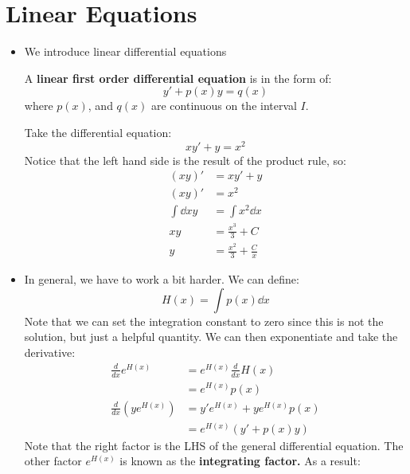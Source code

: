 \section{Linear Equations}
\begin{itemize}
    \item We introduce linear differential equations
    \begin{definition}
        A \textbf{linear first order differential equation} is in the form of:
        \begin{equation}
            y' + p(x)y = q(x)
            \label{eq:}
        \end{equation}
        where $p(x)$, and $q(x)$ are continuous on the interval $I$.
    \end{definition}
    \begin{example}
        Take the differential equation:
        \begin{equation}
            xy' + y= x^2
            \label{eq:}
        \end{equation}
        Notice that the left hand side is the result of the product rule, so:
        \begin{align}
            (xy)' &= xy' + y \\
            (xy)' &= x^2 \\ 
            \int \dd{xy} &= \int x^2 \dd{x} \\ 
            xy &= \frac{x^3}{3} + C \\ 
            y &= \frac{x^2}{3} + \frac{C}{x}
        \end{align}
    \end{example}
    \item In general, we have to work a bit harder. We can define:
    \begin{equation}
        H(x) = \int p(x) \dd{x}
        \label{eq:}
    \end{equation}
    Note that we can set the integration constant to zero since this is not the solution, but just a helpful quantity. We can then exponentiate and take the derivative:
    \begin{align}
        \frac{d}{dx} e^{H(x)} &= e^{H(x)} \frac{d}{dx}H(x) \\ 
        &= e^{H(x)}p(x) \\ 
        \frac{d}{dx}(ye^{H(x)}) &= y'e^{H(x)} + ye^{H(x)}p(x) \\ 
        &= e^{H(x)}(y'+p(x)y)
    \end{align}
    Note that the right factor is the LHS of the general differential equation. The other factor $e^{H(x)}$ is known as the \textbf{integrating factor.} As a result:

\end{itemize}

